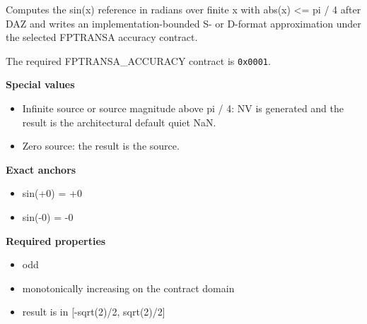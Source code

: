 Computes the sin(x) reference in radians over finite x with abs(x) \textless{}= pi / 4 after DAZ and writes an implementation-bounded S- or D-format approximation under the selected FPTRANSA accuracy contract.

The required FPTRANSA\_ACCURACY contract is \texttt{0x0001}.

\textbf{Special values}\par
\begin{itemize}
\item Infinite source or source magnitude above pi / 4: NV is generated and the result is the architectural default quiet NaN.
\item Zero source: the result is the source.
\end{itemize}

\textbf{Exact anchors}\par
\begin{itemize}
\item sin(+0) = +0
\item sin(-0) = -0
\end{itemize}

\textbf{Required properties}\par
\begin{itemize}
\item odd
\item monotonically increasing on the contract domain
\item result is in [-sqrt(2)/2, sqrt(2)/2]
\end{itemize}
